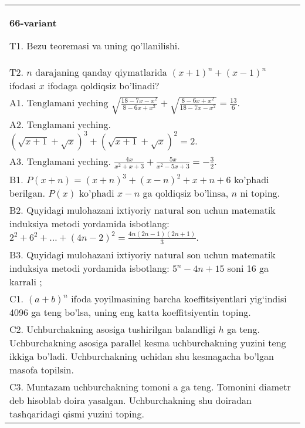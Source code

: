 \documentclass{article}
\begin{document}
\begin{tabular}{m{17cm}}
\textbf{66-variant}
\newline

T1. Bezu teoremasi va uning qo'llanilishi. \\
T2. \(n\) darajaning qanday qiymatlarida \((x + 1)^{n} + (x - 1)^{n}\) ifodasi \(x\) ifodaga qoldiqsiz bo'linadi? \\
A1. Tenglamani yeching \(\sqrt{\frac{18 - 7x - x^{2}}{8 - 6x + x^{2}}} + \sqrt{\frac{8 - 6x + x^{2}}{18 - 7x - x^{2}}} = \frac{13}{6}\). \\
A2. Tenglamani yeching. \((\sqrt{x + 1} + \sqrt{x})^{3} + (\sqrt{x + 1} + \sqrt{x})^{2} = 2\). \\
A3. Tenglamani yeching. \(\frac{4x}{x^{2} + x + 3} + \frac{5x}{x^{2} - 5x + 3} = - \frac{3}{2}\). \\
B1. \(P(x + n) = (x + n)^{3} + (x - n)^{2} + x + n + 6\) ko'phadi berilgan. \(P(x)\) ko'phadi \(x - n\) ga qoldiqsiz bo'linsa, \(n\) ni toping. \\
B2. Quyidagi mulohazani ixtiyoriy natural son uchun matematik induksiya metodi yordamida isbotlang: \(2^{2} + 6^{2} + \ldots + (4n - 2)^{2} = \frac{4n(2n - 1)(2n + 1)}{3}\). \\
B3. Quyidagi mulohazani ixtiyoriy natural son uchun matematik induksiya metodi yordamida isbotlang: \(5^{n} - 4n + 15\) soni 16 ga karrali ; \\
C1. \((a + b)^{n}\) ifoda yoyilmasining barcha koeffitsiyentlari yig`indisi 4096 ga teng bo'lsa, uning eng katta koeffitsiyentin toping. \\
C2. Uchburchakning asosiga tushirilgan balandligi \(h\) ga teng. Uchburchakning asosiga parallel kesma uchburchakning yuzini teng ikkiga bo'ladi. Uchburchakning uchidan shu kesmagacha bo'lgan masofa topilsin. \\
C3. Muntazam uchburchakning tomoni a ga teng. Tomonini diametr deb hisoblab doira yasalgan. Uchburchakning shu doiradan tashqaridagi qismi yuzini toping. \\

\end{tabular}
\vspace{1cm}
\end{document}
